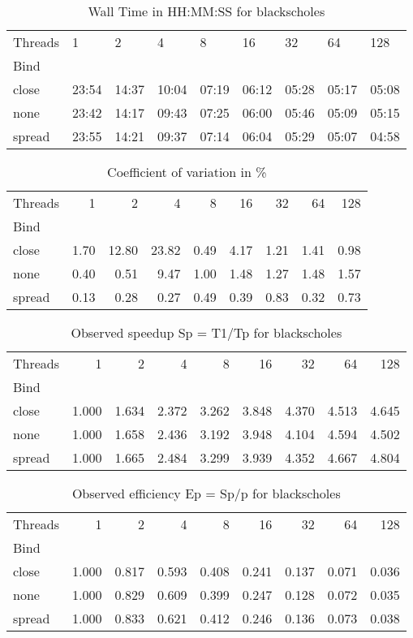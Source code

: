 \begin{table}
\caption{Wall Time in HH:MM:SS for blackscholes}
\label{tab:time_blackscholes}
\begin{tabular}{lllllllll}
\toprule
Threads & 1 & 2 & 4 & 8 & 16 & 32 & 64 & 128 \\
Bind &  &  &  &  &  &  &  &  \\
\midrule
close & 23:54 & 14:37 & 10:04 & 07:19 & 06:12 & 05:28 & 05:17 & 05:08 \\
none & 23:42 & 14:17 & 09:43 & 07:25 & 06:00 & 05:46 & 05:09 & 05:15 \\
spread & 23:55 & 14:21 & 09:37 & 07:14 & 06:04 & 05:29 & 05:07 & 04:58 \\
\bottomrule
\end{tabular}
\end{table}
\begin{table}
\caption{Coefficient of variation in \%}
\label{tab:cv_blackscholes}
\begin{tabular}{lrrrrrrrr}
\toprule
Threads & 1 & 2 & 4 & 8 & 16 & 32 & 64 & 128 \\
Bind &  &  &  &  &  &  &  &  \\
\midrule
close & 1.70 & 12.80 & 23.82 & 0.49 & 4.17 & 1.21 & 1.41 & 0.98 \\
none & 0.40 & 0.51 & 9.47 & 1.00 & 1.48 & 1.27 & 1.48 & 1.57 \\
spread & 0.13 & 0.28 & 0.27 & 0.49 & 0.39 & 0.83 & 0.32 & 0.73 \\
\bottomrule
\end{tabular}
\end{table}
\begin{table}
\caption{Observed speedup Sp = T1/Tp for blackscholes}
\label{tab:speedup_blackscholes}
\begin{tabular}{lrrrrrrrr}
\toprule
Threads & 1 & 2 & 4 & 8 & 16 & 32 & 64 & 128 \\
Bind &  &  &  &  &  &  &  &  \\
\midrule
close & 1.000 & 1.634 & 2.372 & 3.262 & 3.848 & 4.370 & 4.513 & 4.645 \\
none & 1.000 & 1.658 & 2.436 & 3.192 & 3.948 & 4.104 & 4.594 & 4.502 \\
spread & 1.000 & 1.665 & 2.484 & 3.299 & 3.939 & 4.352 & 4.667 & 4.804 \\
\bottomrule
\end{tabular}
\end{table}
\begin{table}
\caption{Observed efficiency Ep = Sp/p for blackscholes}
\label{tab:eff_blackscholes}
\begin{tabular}{lrrrrrrrr}
\toprule
Threads & 1 & 2 & 4 & 8 & 16 & 32 & 64 & 128 \\
Bind &  &  &  &  &  &  &  &  \\
\midrule
close & 1.000 & 0.817 & 0.593 & 0.408 & 0.241 & 0.137 & 0.071 & 0.036 \\
none & 1.000 & 0.829 & 0.609 & 0.399 & 0.247 & 0.128 & 0.072 & 0.035 \\
spread & 1.000 & 0.833 & 0.621 & 0.412 & 0.246 & 0.136 & 0.073 & 0.038 \\
\bottomrule
\end{tabular}
\end{table}
